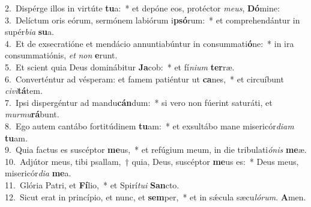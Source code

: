 {2.~}Dispérge illos in virtúte \textbf{tu}a:~* et depóne eos, protéctor \textit{me}\textit{us}, \textbf{Dó}mine:\\
{3.~}Delíctum oris eórum, sermónem labiórum i\textbf{psó}rum:~* et comprehendántur in supér\textit{bi}\textit{a} \textbf{su}a.\\
{4.~}Et de exsecratióne et mendácio annuntiabúntur in consummati\textbf{ó}ne:~* in ira consummatiónis, \textit{et} \textit{non} \textbf{e}runt.\\
{5.~}Et scient quia Deus dominábitur \textbf{Ja}cob:~* et fí\textit{ni}\textit{um} \textbf{ter}ræ.\\
{6.~}Converténtur ad vésperam: et famem patiéntur ut \textbf{ca}nes,~* et circuíbunt \textit{ci}\textit{vi}\textbf{tá}tem.\\
{7.~}Ipsi dispergéntur ad mandu\textbf{cán}dum:~* si vero non fúerint saturáti, et \textit{mur}\textit{mu}\textbf{rá}bunt.\\
{8.~}Ego autem cantábo fortitúdinem \textbf{tu}am:~* et exsultábo mane misericór\textit{di}\textit{am} \textbf{tu}am.\\
{9.~}Quia factus es suscéptor \textbf{me}us,~* et refúgium meum, in die tribulati\textit{ó}\textit{nis} \textbf{me}æ.\\
{10.~}Adjútor meus, tibi psallam,~† quia, Deus, suscéptor \textbf{me}us es:~* Deus meus, misericór\textit{di}\textit{a} \textbf{me}a.\\
{11.~}Glória Patri, et \textbf{Fí}lio,~* et Spirí\textit{tu}\textit{i} \textbf{San}cto.\\
{12.~}Sicut erat in princípio, et nunc, et \textbf{sem}per,~* et in sǽcula sæcu\textit{ló}\textit{rum}. \textbf{A}men.\\
